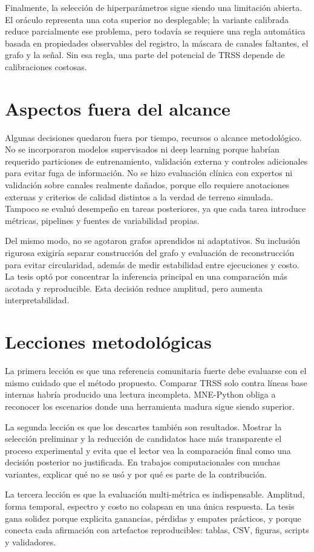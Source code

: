 Finalmente, la selección de hiperparámetros sigue siendo una limitación abierta. El oráculo representa una cota superior no desplegable; la variante calibrada reduce parcialmente ese problema, pero todavía se requiere una regla automática basada en propiedades observables del registro, la máscara de canales faltantes, el grafo y la señal. Sin esa regla, una parte del potencial de TRSS depende de calibraciones costosas.

\section{Aspectos fuera del alcance}

Algunas decisiones quedaron fuera por tiempo, recursos o alcance metodológico. No se incorporaron modelos supervisados ni deep learning porque habrían requerido particiones de entrenamiento, validación externa y controles adicionales para evitar fuga de información. No se hizo evaluación clínica con expertos ni validación sobre canales realmente dañados, porque ello requiere anotaciones externas y criterios de calidad distintos a la verdad de terreno simulada. Tampoco se evaluó desempeño en tareas posteriores, ya que cada tarea introduce métricas, pipelines y fuentes de variabilidad propias.

Del mismo modo, no se agotaron grafos aprendidos ni adaptativos. Su inclusión rigurosa exigiría separar construcción del grafo y evaluación de reconstrucción para evitar circularidad, además de medir estabilidad entre ejecuciones y costo. La tesis optó por concentrar la inferencia principal en una comparación más acotada y reproducible. Esta decisión reduce amplitud, pero aumenta interpretabilidad.

\section{Lecciones metodológicas}

La primera lección es que una referencia comunitaria fuerte debe evaluarse con el mismo cuidado que el método propuesto. Comparar TRSS solo contra líneas base internas habría producido una lectura incompleta. MNE-Python obliga a reconocer los escenarios donde una herramienta madura sigue siendo superior.

La segunda lección es que los descartes también son resultados. Mostrar la selección preliminar y la reducción de candidatos hace más transparente el proceso experimental y evita que el lector vea la comparación final como una decisión posterior no justificada. En trabajos computacionales con muchas variantes, explicar qué no se usó y por qué es parte de la contribución.

La tercera lección es que la evaluación multi-métrica es indispensable. Amplitud, forma temporal, espectro y costo no colapsan en una única respuesta. La tesis gana solidez porque explicita ganancias, pérdidas y empates prácticos, y porque conecta cada afirmación con artefactos reproducibles: tablas, CSV, figuras, scripts y validadores.
